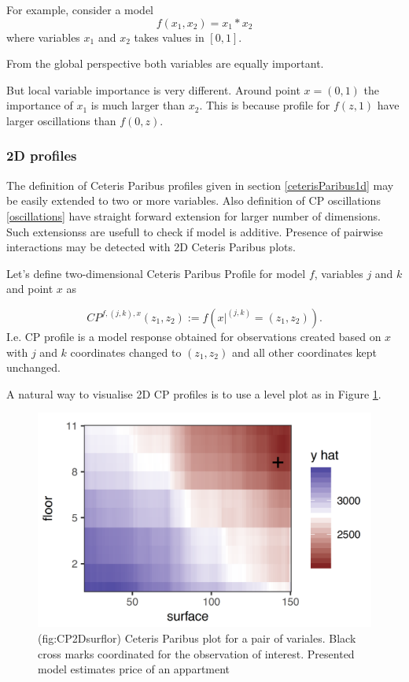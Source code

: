 \documentclass[]{krantz}
\theoremstyle{definition}
\theoremstyle{definition}
\theoremstyle{definition}
\theoremstyle{remark}
\begin{document}
For example, consider a model \[
f(x_1, x_2) = x_1 * x_2
\] where variables \(x_1\) and \(x_2\) takes values in \([0,1]\).

From the global perspective both variables are equally important.

But local variable importance is very different. Around point
\(x = (0, 1)\) the importance of \(x_1\) is much larger than \(x_2\).
This is because profile for \(f(z, 1)\) have larger oscillations than
\(f(0, z)\).

\hypertarget{d-profiles}{%
\subsubsection{2D profiles}\label{d-profiles}}

The definition of Ceteris Paribus profiles given in section
\ref{ceterisParibus1d} may be easily extended to two or more variables.
Also definition of CP oscillations \ref{oscillations} have straight
forward extension for larger number of dimensions. Such extensionss are
usefull to check if model is additive. Presence of pairwise interactions
may be detected with 2D Ceteris Paribus plots.

Let's define two-dimensional Ceteris Paribus Profile for model \(f\),
variables \(j\) and \(k\) and point \(x\) as

\[
CP^{f, (j,k), x}(z_1, z_2) := f(x|^{(j,k)} = (z_1,z_2)).
\] I.e. CP profile is a model response obtained for observations created
based on \(x\) with \(j\) and \(k\) coordinates changed to
\((z_1, z_2)\) and all other coordinates kept unchanged.

A natural way to visualise 2D CP profiles is to use a level plot as in
Figure \ref{fig:CP2Dsurflor}.

\begin{figure}

{\centering \includegraphics[width=0.6\linewidth]{figure/cp_2d_surf_floor} 

}

\caption{(fig:CP2Dsurflor) Ceteris Paribus plot for a pair of variales. Black cross marks coordinated for the observation of interest. Presented model estimates price of an appartment}\label{fig:CP2Dsurflor}
\end{figure}
\end{document}

